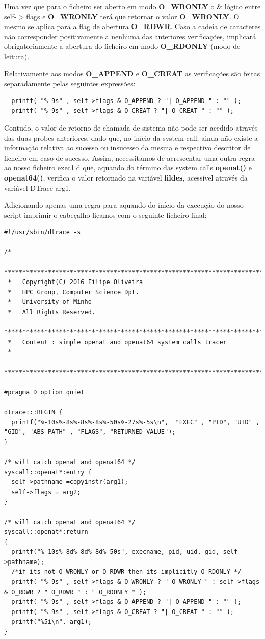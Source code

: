 \documentclass[a4paper]{article}
\begin{document}
 Uma vez que para o ficheiro ser aberto em modo \textbf{O\_WRONLY} o \& lógico entre self-$>$flags e  \textbf{O\_WRONLY} terá que retornar o valor  \textbf{O\_WRONLY}. O mesmo se aplica para a flag de abertura  \textbf{O\_RDWR}. Caso a cadeia de caracteres não corresponder positivamente a nenhuma das anteriores verificações, implicará obrigatoriamente a abertura do ficheiro em modo  \textbf{O\_RDONLY} (modo de leitura).\par 
 Relativamente aos modos  \textbf{O\_APPEND} e  \textbf{O\_CREAT} as verificações são feitas separadamente pelas seguintes expressões:
 \begin{lstlisting}
  printf( "%-9s" , self->flags & O_APPEND ? "| O_APPEND " : "" );
  printf( "%-9s" , self->flags & O_CREAT ? "| O_CREAT " : "" );
   \end{lstlisting}
\par 
Contudo, o valor de retorno de chamada de sistema não pode ser acedido através das duas probes anteriores, dado que, no início da system call, ainda não existe a informação relativa ao sucesso ou insucesso da mesma e respectivo descritor de ficheiro em caso de sucesso. Assim, necessitamos de acrescentar uma outra regra ao nosso ficheiro exec1.d que, aquando do término das system calls \textbf{openat()} e \textbf{openat64()}, verifica o valor retornado na variável \textbf{fildes}, acessível através da variável DTrace arg1.\par 
Adicionando apenas uma regra para aquando do início da execução do nosso script imprimir o cabeçalho ficamos com o seguinte ficheiro final:
 \begin{lstlisting}[basicstyle=\scriptsize]
 #!/usr/sbin/dtrace -s

/*
 ********************************************************************************
 *   Copyright(C) 2016 Filipe Oliveira
 *   HPC Group, Computer Science Dpt.
 *   University of Minho
 *   All Rights Reserved.
 ********************************************************************************
 *   Content : simple openat and openat64 system calls tracer
 *     
 ********************************************************************************/

#pragma D option quiet

dtrace:::BEGIN {
  printf("%-10s%-8s%-8s%-8s%-50s%-27s%-5s\n",  "EXEC" , "PID", "UID" , "GID", "ABS PATH" , "FLAGS", "RETURNED VALUE");
}

/* will catch openat and openat64 */
syscall::openat*:entry {
  self->pathname =copyinstr(arg1);
  self->flags = arg2;
}

/* will catch openat and openat64 */
syscall::openat*:return
{
  printf("%-10s%-8d%-8d%-8d%-50s", execname, pid, uid, gid, self->pathname);
  /*if its not O_WRONLY or O_RDWR then its implicitly O_RDONLY */
  printf( "%-9s" , self->flags & O_WRONLY ? " O_WRONLY " : self->flags & O_RDWR ? " O_RDWR " : " O_RDONLY " ); 
  printf( "%-9s" , self->flags & O_APPEND ? "| O_APPEND " : "" );
  printf( "%-9s" , self->flags & O_CREAT ? "| O_CREAT " : "" );
  printf("%5i\n", arg1); 
}


 \end{lstlisting}
\end{document}
